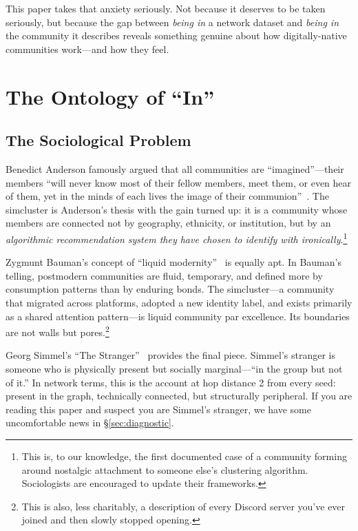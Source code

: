 \documentclass[11pt,a4paper]{article}
\begin{document}
This paper takes that anxiety seriously. Not because it deserves to be taken seriously, but because the gap between \textit{being in} a network dataset and \textit{being in} the community it describes reveals something genuine about how digitally-native communities work---and how they feel.

\section{The Ontology of ``In''}

\subsection{The Sociological Problem}

Benedict Anderson famously argued that all communities are ``imagined''---their members ``will never know most of their fellow members, meet them, or even hear of them, yet in the minds of each lives the image of their communion''~\cite{anderson1983}. The simcluster is Anderson's thesis with the gain turned up: it is a community whose members are connected not by geography, ethnicity, or institution, but by an \textit{algorithmic recommendation system they have chosen to identify with ironically}.\footnote{This is, to our knowledge, the first documented case of a community forming around nostalgic attachment to someone else's clustering algorithm. Sociologists are encouraged to update their frameworks.}

Zygmunt Bauman's concept of ``liquid modernity''~\cite{bauman2000} is equally apt. In Bauman's telling, postmodern communities are fluid, temporary, and defined more by consumption patterns than by enduring bonds. The simcluster---a community that migrated across platforms, adopted a new identity label, and exists primarily as a shared attention pattern---is liquid community par excellence. Its boundaries are not walls but pores.\footnote{This is also, less charitably, a description of every Discord server you've ever joined and then slowly stopped opening.}

Georg Simmel's ``The Stranger''~\cite{simmel1908} provides the final piece. Simmel's stranger is someone who is physically present but socially marginal---``in the group but not of it.'' In network terms, this is the account at hop distance 2 from every seed: present in the graph, technically connected, but structurally peripheral. If you are reading this paper and suspect you are Simmel's stranger, we have some uncomfortable news in \S\ref{sec:diagnostic}.
\end{document}
